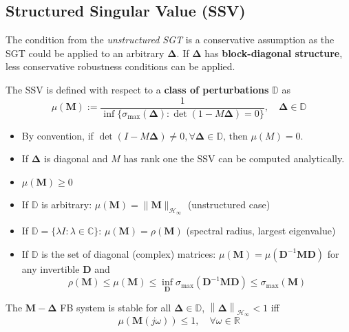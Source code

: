 \subsection{Structured Singular Value (SSV)}
The condition from the \textit{unstructured SGT} is a conservative assumption as the SGT could be applied to an arbitrary $\boldsymbol{\Delta}$.
If $\boldsymbol{\Delta}$ has \textbf{block-diagonal structure}, less conservative robustness conditions can be applied.

\newpar{}

The SSV is defined with respect to a \textbf{class of perturbations} $\mathbb{D}$ as
\begin{equation*}
    \mu(\mathbf{M}):=\frac1{\inf\{\sigma_{\max}(\boldsymbol{\Delta}):\det(1-M\boldsymbol{\Delta})=0\}},\quad\boldsymbol{\Delta}\in\mathbb{D}
\end{equation*}
\begin{itemize}
    \item By convention, if $\det(I-M\boldsymbol{\Delta})\neq0,\forall\boldsymbol{\Delta}\in\mathbb{D}\text{, then }\mu(M)=0$.
    \item If $\boldsymbol{\Delta}$ is diagonal and $M$ has rank one the SSV can be computed analytically.
\end{itemize}

\begin{itemize}
    \item $\mu(\mathbf{M})\geq0$
    \item If $\mathbb{D}$ is arbitrary: $\mu(\mathbf{M})=\|\mathbf{M}\|_{\mathcal{H}_\infty}$ (unstructured case)
    \item If $\mathbb{D}=\{\lambda I:\lambda\in\mathbb{C}\}$: $\mu(\mathbf{M})=\rho(\mathbf{M})$ (spectral radius, largest eigenvalue)
    \item If $\mathbb{D}$ is the set of diagonal (complex) matrices: $\mu(\mathbf{M})=\mu(\mathbf{D}^{-1}\mathbf{MD})$ for any invertible $\mathbf{D}$ and
          \begin{equation*}
              \rho(\mathbf{M})\leq\mu(\mathbf{M})\leq\inf_{\mathbf{D}}\sigma_{\max}(\mathbf{D}^{-1}\mathbf{MD})\leq\sigma_{\max}(\mathbf{M})
          \end{equation*}
\end{itemize}



The $\mathbf{M}-\boldsymbol{\Delta}$ FB system is stable for all $\boldsymbol{\Delta}\in \mathbb{D}$, $\left\|\boldsymbol{\Delta}\right\|_{\mathcal{H}_\infty}<1$ iff
\begin{equation*}
    \mu(\mathbf{M}(j\omega))\leq1,\quad\forall\omega\in\mathbb{R}
\end{equation*}

